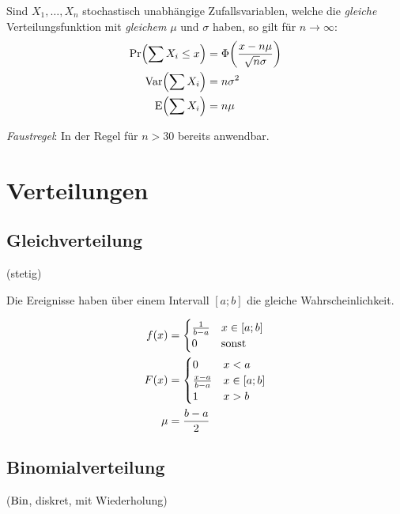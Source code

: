 Sind $X_1,\ldots,X_n$ stochastisch unabhängige Zufallsvariablen, welche die \emph{gleiche} Verteilungsfunktion mit \emph{gleichem} $\mu$ und $\sigma$ haben, so gilt für $n\to\infty$:
\begin{align*}
  \Pr \Bigl( \sum X_i \leq x \Bigr) & = \Phi\bigg( \frac{x-n\mu}{\sqrt{n}\sigma}\bigg )\\
  \operatorname{Var}\Bigl( \sum X_i        \Bigr) & = n\sigma^{2}\\
  \operatorname{E}  \Bigl( \sum X_i        \Bigr) & = n\mu
\end{align*}


\emph{Faustregel}: In der Regel für $n>30$ bereits anwendbar.


\chapter{Verteilungen}


\section{Gleichverteilung}

(stetig)

Die Ereignisse haben über einem Intervall $[a;b]$ die gleiche Wahrscheinlichkeit.

\begin{align*}
  f(x) & =
  \begin{cases}
    \frac{1}{b-a} & x\in[a;b]\\
		0 & \hbox{sonst}
  \end{cases}\\
  F(x) & =
  \begin{cases}
                  0 & x<a\\
    \frac{x-a}{b-a} & x\in[a;b]\\
		  1 & x>b
  \end{cases}\\
  \mu & =
  \frac{b-a}{2}
\end{align*}



\section{Binomialverteilung}

($\operatorname{Bin}$, diskret, mit Wiederholung)

